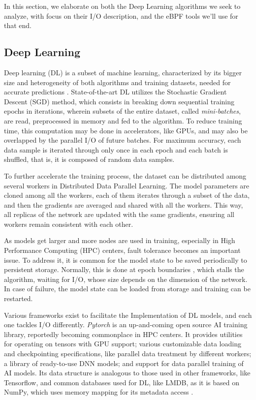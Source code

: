 \documentclass[conference]{IEEEtran}
\begin{document}
In this section, we elaborate on both the Deep Learning algorithms we seek to analyze, with focus on their I/O description, and the eBPF tools we'll use for that end.

\subsection{Deep Learning}

Deep learning (DL) is a subset of machine learning, characterized by its bigger size and heterogeneity of both algorithms and training datasets, needed for accurate predictions \cite{gradient}. State-of-the-art DL utilizes the Stochastic Gradient Descent (SGD) method, which consists in breaking down sequential training epochs in iterations, wherein subsets of the entire dataset, called \textit{mini-batches}, are read, preprocessed in memory and fed to the algorithm. To reduce training time, this computation may be done in accelerators, like GPUs, and may also be overlapped by the parallel I/O of future batches. For maximum accuracy, each data sample is iterated through only once in each epoch and each batch is shuffled, that is, it is composed of random data samples.

To further accelerate the training process, the dataset can be distributed among several workers in Distributed Data Parallel Learning. The model parameters are cloned among all the workers, each of them iterates through a subset of the data, and then the gradients are averaged and shared with all the workers. This way, all replicas of the network are updated with the same gradients, ensuring all workers remain consistent with each other.

As models get larger and more nodes are used in training, especially in High Performance Computing (HPC) centers, fault tolerance becomes an important issue. To address it, it is common for the model state to be saved periodically to persistent storage. Normally, this is done at epoch boundaries \cite{checkfreq}, which stalls the algorithm, waiting for I/O, whose size depends on the dimension of the network. In case of failure, the model state can be loaded from storage and training can be restarted.

Various frameworks exist to facilitate the Implementation of DL models, and each one tackles I/O differently. \textit{Pytorch} \cite{pytorch} is an up-and-coming open source AI training library, reportedly becoming commonplace in HPC centers. It provides utilities for operating on tensors with GPU support; various customizable data loading and checkpointing specifications, like parallel data treatment by different workers; a library of ready-to-use DNN models; and support for data parallel training of AI models. Its data structure is analogous to those used in other frameworks, like Tensorflow, and common databases used for DL, like LMDB, as it is based on NumPy, which uses memory mapping for its metadata access \cite{LMDB}.
\end{document}
